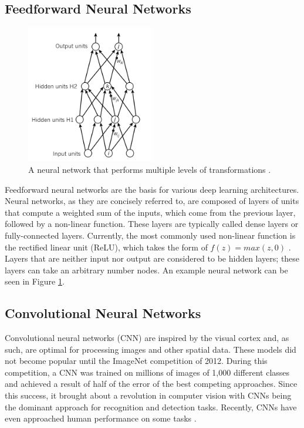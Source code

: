 \subsection{Feedforward Neural Networks}

\begin{figure}
    \centering
    \includegraphics[width=0.5\textwidth]{images/mlp.png}
    \caption{A neural network that performs multiple levels of transformations \cite{Nature_DL}.}
    \label{mlp}
\end{figure}
Feedforward neural networks are the basis for various deep learning architectures. Neural networks, as they are concisely referred to, are composed of layers of units that compute a weighted sum of the inputs, which come from the previous layer, followed by a non-linear function. These layers are typically called dense layers or fully-connected layers. Currently, the most commonly used non-linear function is the rectified linear unit (ReLU), which takes the form of $f(z) = max(z, 0)$ \cite{Nature_DL}. Layers that are neither input nor output are considered to be hidden layers; these layers can take an arbitrary number nodes. An example neural network can be seen in Figure \ref{mlp}.

\subsection{Convolutional Neural Networks}
Convolutional neural networks (CNN) are inspired by the visual cortex and, as such, are optimal for processing images and other spatial data. These models did not become popular until the ImageNet competition of 2012. During this competition, a CNN was trained on millions of images of 1,000 different classes and achieved a result of half of the error of the best competing approaches. Since this success, it brought about a revolution in computer vision with CNNs being the dominant approach for recognition and detection tasks. Recently, CNNs have even approached human performance on some tasks \cite{Nature_DL}.

